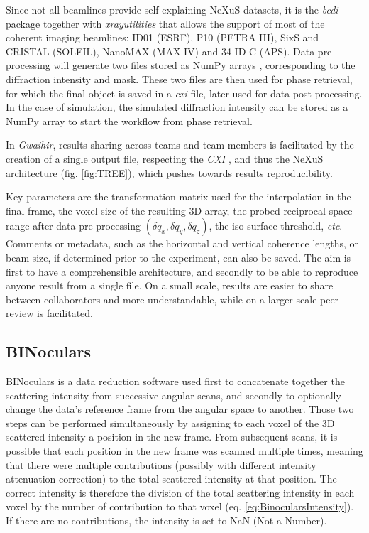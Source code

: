 Since not all beamlines provide self-explaining NeXuS datasets, it is the \textit{bcdi} package together with \textit{xrayutilities} \cite{Kriegner2013} that allows the support of most of the coherent imaging beamlines: ID01 (ESRF), P10 (PETRA III), SixS and CRISTAL (SOLEIL), NanoMAX (MAX IV) and 34-ID-C (APS).
Data pre-processing will generate two files stored as NumPy arrays \cite{VanDerWalt2011}, corresponding to the diffraction intensity and mask.
These two files are then used for phase retrieval, for which the final object is saved in a \textit{cxi} file, later used for data post-processing.
In the case of simulation, the simulated diffraction intensity can be stored as a NumPy array to start the workflow from phase retrieval.

In \textit{Gwaihir}, results sharing across teams and team members is facilitated by the creation of a single output file, respecting the \textit{CXI} \cite{Maia2012}, and thus the NeXuS \cite{Konnecke2015} architecture (fig. \ref{fig:TREE}), which pushes towards results reproducibility.

Key parameters are the transformation matrix used for the interpolation in the final frame, the voxel size of the resulting 3D array, the probed reciprocal space range after data pre-processing $(\delta q_x , \delta q_y , \delta q_z)$, the iso-surface threshold, \textit{etc}.
Comments or metadata, such as the horizontal and vertical coherence lengths, or beam size, if determined prior to the experiment, can also be saved.
The aim is first to have a comprehensible architecture, and secondly to be able to reproduce anyone result from a single file.
On a small scale, results are easier to share between collaborators and more understandable, while on a larger scale peer-review is facilitated.

\subsection{BINoculars} \label{sec:BINoculars}

BINoculars \parencite{Roobol2015} is a data reduction software used first to concatenate together the scattering intensity from successive angular scans, and secondly to optionally change the data's reference frame from the angular space to another.
Those two steps can be performed simultaneously by assigning to each voxel of the 3D scattered intensity a position in the new frame.
From subsequent scans, it is possible that each position in the new frame was scanned multiple times, meaning that there were multiple contributions (possibly with different intensity attenuation correction) to the total scattered intensity at that position.
The correct intensity is therefore the division of the total scattering intensity in each voxel by the number of contribution to that voxel (eq. \ref{eq:BinocularsIntensity}).
If there are no contributions, the intensity is set to NaN (Not a Number).

